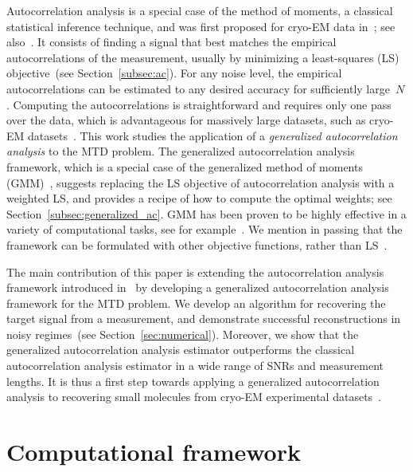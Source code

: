 \documentclass{article}
\begin{document}
Autocorrelation analysis is a special case of the method of moments, a classical statistical inference technique, {and was first proposed for cryo-EM data in~\cite{kam1980reconstruction}; see also~\cite{bhamre2015orthogonal,bhamre2017anisotropic,levin20183d}}. It consists of finding a signal that best matches the empirical autocorrelations of the measurement, {usually} by minimizing a least-squares (LS) objective~(see Section~\ref{subsec:ac}). For any noise level, the empirical autocorrelations can be estimated to any desired accuracy for sufficiently large~$N$. Computing the autocorrelations is straightforward and requires only one pass over the data, which is advantageous for massively large datasets, such as \mbox{cryo-EM} datasets~\cite{bendory2020single}. This work studies the application of a \textit{generalized autocorrelation analysis} to the MTD problem. The generalized autocorrelation analysis framework, which is a special case of the generalized method of moments (GMM)~\cite{Hansen1982}, suggests replacing the LS objective of autocorrelation analysis with a weighted LS, and provides a recipe of how to compute the optimal weights; see Section~\ref{subsec:generalized_ac}. GMM has been proven to be highly effective in a variety of computational tasks, see for example~\cite{wooldridge2001applications,akbar2016more,fan2018optimal,roodman2009xtabond2,abas2021generalized}. We {mention in passing} that the framework can be formulated with other objective functions, rather than LS~\cite{de2002properties}.

The main contribution of this paper is extending the autocorrelation analysis framework introduced in~\cite{bendory2019multi} by developing a generalized autocorrelation analysis framework for the MTD problem. We develop an algorithm for recovering the target signal from a measurement, and demonstrate successful reconstructions in noisy regimes~(see Section~\ref{sec:numerical}). Moreover, we show that the generalized autocorrelation analysis estimator outperforms the classical autocorrelation analysis estimator in {a wide range of} SNRs and measurement lengths. It is thus a first step towards applying a generalized autocorrelation analysis to recovering small molecules from \mbox{cryo-EM} {experimental datasets}~\cite{bendory2018toward}.

\section{Computational framework}
\label{sec:math}
\end{document}
